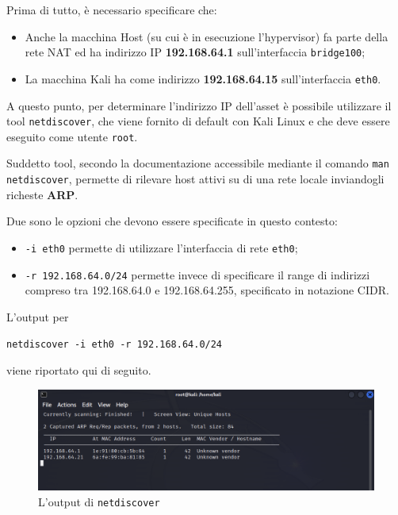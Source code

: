 \documentclass[a4paper, 12pt, oneside]{article}
\begin{document}
Prima di tutto, è necessario specificare che:

\begin{itemize}
    \item Anche la macchina Host (su cui è in esecuzione l'hypervisor) fa parte della rete NAT ed ha indirizzo IP \textbf{192.168.64.1} sull'interfaccia \texttt{bridge100};
    \item La macchina Kali ha come indirizzo \textbf{192.168.64.15} sull'interfaccia \texttt{eth0}.
\end{itemize}

A questo punto, per determinare l'indirizzo IP dell'asset è possibile utilizzare il tool \texttt{netdiscover}, che viene fornito di default con Kali Linux e che deve essere eseguito come utente \texttt{root}.

Suddetto tool, secondo la documentazione accessibile mediante il comando \texttt{man netdiscover}, permette di rilevare host attivi su di una rete locale inviandogli richeste \textbf{ARP}. 

Due sono le opzioni che devono essere specificate in questo contesto:

\begin{itemize}
    \item \texttt{-i eth0} permette di utilizzare l'interfaccia di rete \texttt{eth0};
    \item \texttt{-r 192.168.64.0\slash24} permette invece di specificare il range di indirizzi compreso tra 192.168.64.0 e 192.168.64.255, specificato in notazione CIDR.
\end{itemize}

\newpage
L'output per
\begin{center}
    \texttt{netdiscover -i eth0 -r 192.168.64.0\slash24}
\end{center}

viene riportato qui di seguito.

\begin{figure}[h]
    \centering
    \includegraphics[width=\textwidth]{img/netdiscover.png}
    \caption{L'output di \texttt{netdiscover}}
\end{figure}
\end{document}
